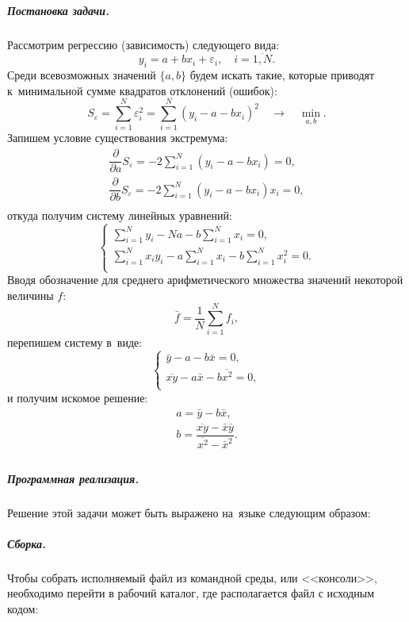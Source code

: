 \subparagraph{Постановка задачи.}
Рассмотрим регрессию (зависимость) следующего вида:
\begingroup
\newcommand{\SumN}{\ensuremath{\sum\limits_{i=1}^{N}}}
\[
y_i = a + b x_i + \varepsilon_i,\quad i = \overline{1, N}.
\]
Среди всевозможных значений \(\{ a, b \}\) будем искать такие, которые приводят к~минимальной сумме квадратов отклонений (ошибок):
\[
S_{\varepsilon} = \SumN \varepsilon_i^2 = \SumN (y_i - a - b x_i)^2\quad\rightarrow\quad \min\limits_{a, b}.
\]
Запишем условие существования экстремума:
\[
\begin{array}{l}
    \dfrac{\partial}{\partial a} S_{\varepsilon} = -2 \SumN (y_i - a - b x_i) = 0, \\[2ex]
    \dfrac{\partial}{\partial b} S_{\varepsilon} = -2 \SumN (y_i - a - b x_i) x_i = 0, \\
\end{array}
\]
откуда получим систему линейных уравнений:
\[
\left\{ \begin{array}{l}
    \SumN y_i - N a - b\SumN x_i = 0, \\[2ex]
    \SumN x_i y_i - a\SumN x_i - b\SumN x_i^2 = 0. \\
\end{array} \right.
\]
Вводя обозначение для среднего арифметического множества значений некоторой величины \(f\):
\[
\bar f = \dfrac{1}{N}\SumN f_i,
\]
перепишем систему в~виде:
\[
\left\{ \begin{array}{l}
    \bar y - a - b\bar x = 0, \\
    \overline{x y} - a\bar x - b\overline{x^2} = 0, \\
\end{array} \right.
\]
и получим искомое решение:
\[
\boxed{ \begin{array}{l}
        a = \bar y - b\bar x, \\
        b = \dfrac{\overline{x y} - \bar x\bar y}{\overline{x^2} - \bar x^2}. \\
\end{array} }
\]
\endgroup



\subparagraph{Программная реализация.}
Решение этой задачи может быть выражено на~языке  следующим образом:\label{code:lsm}




\subparagraph{Сборка.}
Чтобы собрать исполняемый файл из командной среды, или <<консоли>>, необходимо перейти в рабочий каталог, где располагается файл с исходным кодом:

